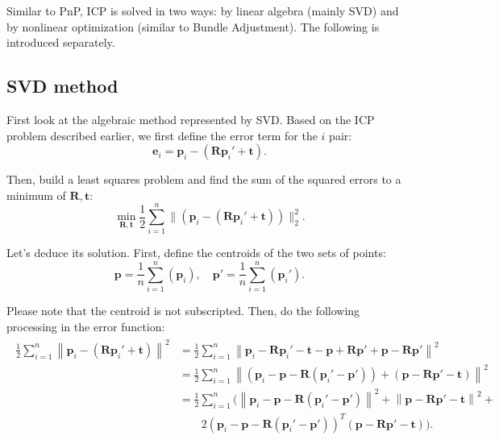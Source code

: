 Similar to PnP, ICP is solved in two ways: by linear algebra (mainly SVD) and by nonlinear optimization (similar to Bundle Adjustment). The following is introduced separately.

\subsection{SVD method}
First look at the algebraic method represented by SVD. Based on the ICP problem described earlier, we first define the error term for the $i$ pair:
\begin{equation}
\bm{e}_i = \bm{p}_i - (\bm{R} \bm{p}_i' + \bm{t} ) .
\end{equation}

Then, build a least squares problem and find the sum of the squared errors to a minimum of $\bm{R}, \bm{t}$:
\begin{equation}
\mathop {\min }\limits_{\bm{R}, \bm{t}} \frac{1}{2} \sum\limits_{i = 1}^n\| {\left( {{\bm {p}_i} - \left( {\bm{R}{\bm{p}_i}' + \bm{t}} \right)} \right)} \|^2_2.
\end{equation}

Let's deduce its solution. First, define the centroids of the two sets of points:
\begin{equation}
\bm{p} = \frac{1}{n}\sum_{i=1}^n ( \bm{p}_i ), \quad \bm{p}' = \frac{1}{n} \sum_{i=1}^n ( \bm{p}_i' ).
\end{equation}

Please note that the centroid is not subscripted. Then, do the following processing in the error function:
\begin{align*}
\begin{array}{ll}
\frac{1}{2}\sum\limits_{i = 1}^n {{{\left\| {{\bm{p}_i} - \left( {\bm{R}{ \bm{p}_i}' + \bm{t}} \right)} \right\|}^2}}  & = \frac{1}{2}\sum\limits_{i = 1}^n {{{\left\| {{\bm{p}_i} - \bm{R}{\bm{p}_i}' - \bm{t} - \bm{p} + \bm{Rp}' + \bm{p} - \bm{Rp}'} \right\|}^2}} \\
 & = \frac{1}{2}\sum\limits_{i = 1}^n {{{\left\| {\left( {{\bm{p}_i} - \bm{p} - \bm{R}\left( {{\bm{p}_i}' - \bm{p}'} \right)} \right) + \left( {\bm{p} - \bm{Rp}' - \bm{t}} \right)} \right\|}^2}} \\
& = \frac{1}{2}\sum\limits_{i = 1}^n ( {{\left\| {{\bm{p}_i} - \bm{p} - \bm{R}\left( {{\bm{p}_i}' - \bm{p}'} \right)} \right\|}^2} + {{\left\| {\bm{p} - \bm{Rp}' - \bm{t}} \right\|}^2} +\\
& \quad \quad 2{{\left( {{\bm{p}_i} - \bm{p} - \bm{R}\left( {{\bm{p}_i}' - \bm{p}'} \right)} \right)}^T}\left( {\bm{p} - \bm{Rp}' - \bm{t}} \right)).
\end{array}
\end{align*}

